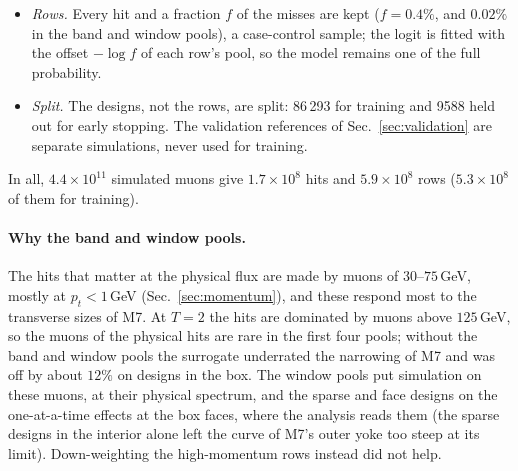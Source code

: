\documentclass[11pt,a4paper]{article}
\begin{document}
\begin{itemize}
        training data is dense. Selecting muons by their kinematics does not bias it either: the
        \emph{band} pools simulate only muons of $p_z=20$--$80$\,GeV ($T=2.5$), and the
        \emph{window} pools only those of $p_z=30$--$60$\,GeV and $p_t<1.2$\,GeV, at the
        physical spectrum ($T=1$; $2\times10^7$ muons per design, about 30 hits at the nominal
        design).
  \item \emph{Rows.} Every hit and a fraction $f$ of the misses are kept ($f=0.4\%$, and $0.02\%$
        in the band and window pools), a case-control sample; the logit is fitted with the
        offset $-\log f$ of each row's pool, so the model remains one of the full probability.
  \item \emph{Split.} The designs, not the rows, are split: 86\,293 for training and 9588 held
        out for early stopping. The validation references of Sec.~\ref{sec:validation} are
        separate simulations, never used for training.
\end{itemize}
In all, $4.4\times10^{11}$ simulated muons give $1.7\times10^8$ hits and $5.9\times10^8$ rows
($5.3\times10^8$ of them for training).

\paragraph{Why the band and window pools.}
The hits that matter at the physical flux are made by muons of $30$--$75$\,GeV, mostly at
$p_t<1$\,GeV (Sec.~\ref{sec:momentum}), and these respond most to the transverse sizes of M7. At
$T=2$ the hits are dominated by muons above $125$\,GeV, so the muons of the physical hits are
rare in the first four pools; without the band and window pools the surrogate underrated the
narrowing of M7 and was off by about $12\%$ on designs in the box. The window pools put
simulation on these muons, at their physical spectrum, and the sparse and face designs on the
one-at-a-time effects at the box faces, where the analysis reads them (the sparse designs in the
interior alone left the curve of M7's outer yoke too steep at its limit). Down-weighting the
high-momentum rows instead did not help.
\end{document}
